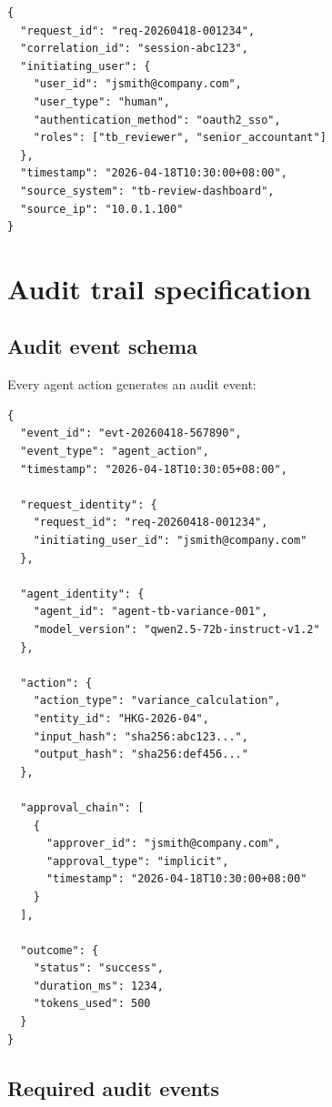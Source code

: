 \begin{lstlisting}[basicstyle=\ttfamily\small,caption={Request identity record schema.}]
{
  "request_id": "req-20260418-001234",
  "correlation_id": "session-abc123",
  "initiating_user": {
    "user_id": "jsmith@company.com",
    "user_type": "human",
    "authentication_method": "oauth2_sso",
    "roles": ["tb_reviewer", "senior_accountant"]
  },
  "timestamp": "2026-04-18T10:30:00+08:00",
  "source_system": "tb-review-dashboard",
  "source_ip": "10.0.1.100"
}
\end{lstlisting}

\section{Audit trail specification}

\subsection{Audit event schema}

Every agent action generates an audit event:

\begin{lstlisting}[basicstyle=\ttfamily\small,caption={Audit event schema.}]
{
  "event_id": "evt-20260418-567890",
  "event_type": "agent_action",
  "timestamp": "2026-04-18T10:30:05+08:00",
  
  "request_identity": {
    "request_id": "req-20260418-001234",
    "initiating_user_id": "jsmith@company.com"
  },
  
  "agent_identity": {
    "agent_id": "agent-tb-variance-001",
    "model_version": "qwen2.5-72b-instruct-v1.2"
  },
  
  "action": {
    "action_type": "variance_calculation",
    "entity_id": "HKG-2026-04",
    "input_hash": "sha256:abc123...",
    "output_hash": "sha256:def456..."
  },
  
  "approval_chain": [
    {
      "approver_id": "jsmith@company.com",
      "approval_type": "implicit",
      "timestamp": "2026-04-18T10:30:00+08:00"
    }
  ],
  
  "outcome": {
    "status": "success",
    "duration_ms": 1234,
    "tokens_used": 500
  }
}
\end{lstlisting}

\subsection{Required audit events}

